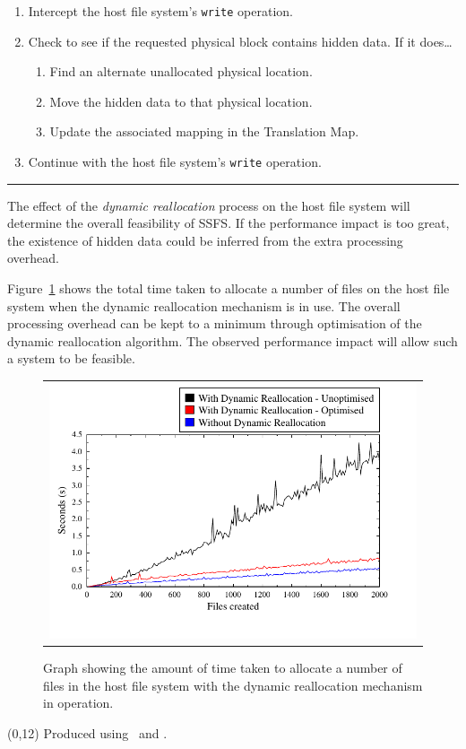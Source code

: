 \documentclass[portrait, a0]{a0poster}
\def\Heading#1{\noindent{\hfill{\LARGE{\color{DarkBlue} \bf #1}}}\medskip\hrule}
\begin{document}
\begin{textblock}{8}
\begin{enumerate}
\item Intercept the host file system's \texttt{write} operation.
\item Check to see if the requested physical block contains hidden data. If it does\ldots
 \begin{enumerate}
  \item Find an alternate unallocated physical location.
  \item Move the hidden data to that physical location.
  \item Update the associated mapping in the Translation Map.
 \end{enumerate}
\item Continue with the host file system's \texttt{write} operation.
\end{enumerate}

\Heading{Results}

The effect of the \emph{dynamic reallocation} process on the host file system will determine the overall feasibility of SSFS. If the performance impact is too great, the existence of hidden data could be inferred from the extra processing overhead.

Figure~\ref{fig:graph} shows the total time taken to allocate a number of files on the host file system when the dynamic reallocation mechanism is in use. The overall processing overhead can be kept to a minimum through optimisation of the dynamic reallocation algorithm. The observed performance impact will allow such a system to be feasible.

\begin{figure}
\centering
\begin{tabular}{c}
\\
\includegraphics[scale=1.5]{pics/graph1.pdf}
\end{tabular}
\caption{Graph showing the amount of time taken to allocate a number of files in the host file system with the dynamic reallocation mechanism in operation. \label{fig:graph}}
\end{figure}

\end{textblock}

\begin{textblock}{8}(0,12)
\footnotesize
Produced using \LaTeXe\ and \MP.
\end{textblock}
\end{document}

